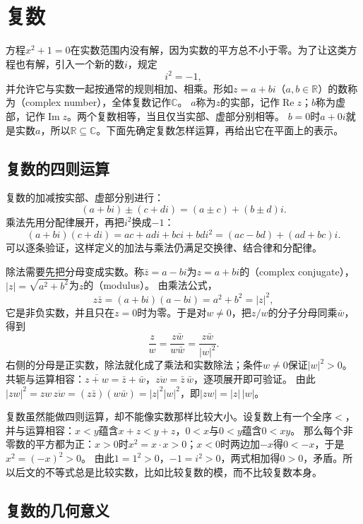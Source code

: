 \section{复数}
\label{sec:ru-complex-numbers}

方程$x^2+1=0$在实数范围内没有解，因为实数的平方总不小于零。为了让这类方程也有解，引入一个新的数$i$，规定
\[
 i^2=-1,
\]
并允许它与实数一起按通常的规则相加、相乘。形如$z=a+bi$（$a,b\in\mathbb R$）的数称为（complex number），全体复数记作$\mathbb C$。
$a$称为$z$的实部，记作$\operatorname{Re}z$；$b$称为虚部，记作$\operatorname{Im}z$。两个复数相等，当且仅当实部、虚部分别相等。
$b=0$时$a+0i$就是实数$a$，所以$\mathbb R\subseteq\mathbb C$。下面先确定复数怎样运算，再给出它在平面上的表示。

\subsection{复数的四则运算}
\label{sec:ru-complex-arithmetic}

复数的加减按实部、虚部分别进行：
\[
 (a+bi)\pm(c+di)=(a\pm c)+(b\pm d)i.
\]
乘法先用分配律展开，再把$i^2$换成$-1$：
\[
 (a+bi)(c+di)=ac+adi+bci+bdi^2=(ac-bd)+(ad+bc)i.
\]
可以逐条验证，这样定义的加法与乘法仍满足交换律、结合律和分配律。

除法需要先把分母变成实数。称$\bar z=a-bi$为$z=a+bi$的（complex conjugate），$|z|=\sqrt{a^2+b^2}$为$z$的（modulus）。
由乘法公式，
\[
 z\bar z=(a+bi)(a-bi)=a^2+b^2=|z|^2,
\]
它是非负实数，并且只在$z=0$时为零。于是对$w\neq0$，把$z/w$的分子分母同乘$\bar w$，得到
\[
 \frac zw=\frac{z\bar w}{w\bar w}=\frac{z\bar w}{|w|^2}.
\]
右侧的分母是正实数，除法就化成了乘法和实数除法；条件$w\neq0$保证$|w|^2>0$。
共轭与运算相容：$\overline{z+w}=\bar z+\bar w$，$\overline{zw}=\bar z\,\bar w$，逐项展开即可验证。
由此$|zw|^2=zw\,\overline{zw}=(z\bar z)(w\bar w)=|z|^2|w|^2$，即$|zw|=|z|\,|w|$。

复数虽然能做四则运算，却不能像实数那样比较大小。设复数上有一个全序$<$，并与运算相容：$x<y$蕴含$x+z<y+z$，$0<x$与$0<y$蕴含$0<xy$。
那么每个非零数的平方都为正：$x>0$时$x^2=x\cdot x>0$；$x<0$时两边加$-x$得$0<-x$，于是$x^2=(-x)^2>0$。
由此$1=1^2>0$，$-1=i^2>0$，两式相加得$0>0$，矛盾。所以后文的不等式总是比较实数，比如比较复数的模，而不比较复数本身。

\subsection{复数的几何意义}
\label{sec:ru-complex-geometry}

